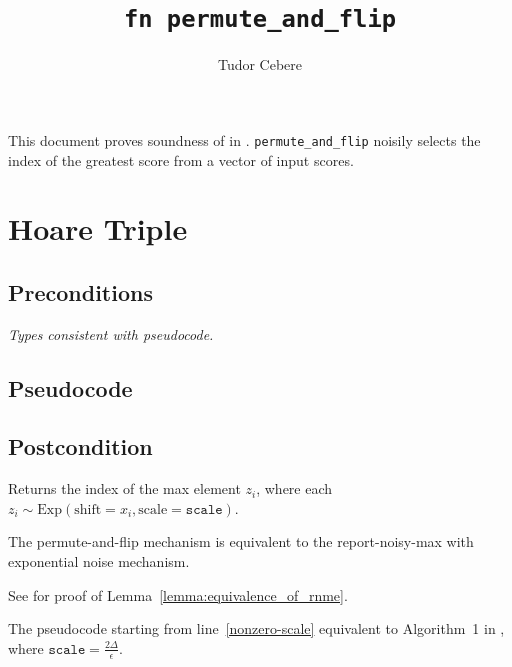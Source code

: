 \documentclass{article}
\title{\texttt{fn permute\_and\_flip}}
\author{Tudor Cebere}
\begin{document}
\maketitle\contrib
This document proves soundness of  \cite{mckenna2020permute} in . 
\texttt{permute\_and\_flip} noisily selects the index of the greatest score from a vector of input scores.

\section{Hoare Triple}
\subsection*{Preconditions}
\textit{Types consistent with pseudocode.}

\subsection*{Pseudocode}
\label{sec:python-pseudocode}


\subsection*{Postcondition}
\begin{theorem}
    \label{postcondition}
    Returns the index of the max element $z_i$,
    where each $z_i \sim \mathrm{Exp}(\mathrm{shift}=x_i, \mathrm{scale}=\texttt{scale})$.
\end{theorem}

\begin{lemma}
    \label{lemma:equivalence_of_rnme}
    The permute-and-flip mechanism is equivalent to the report-noisy-max with exponential noise mechanism. 
\end{lemma}
See \cite{ding2021permute} for proof of Lemma~\ref{lemma:equivalence_of_rnme}.

\begin{lemma}
    \label{lemma:algorithm1}
    The pseudocode starting from line~\ref{nonzero-scale} equivalent to Algorithm~1 in \cite{mckenna2020permute},
    where $\texttt{scale} = \frac{2\Delta}{\epsilon}$.
\end{lemma}
\end{document}
